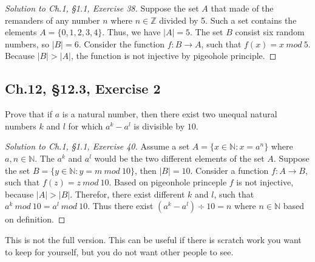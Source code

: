\documentclass[12pt]{amsart}
\numberwithin{equation}{section}
\theoremstyle{definition}
\theoremstyle{remark}
\newif\ifnotes
\begin{document}
\begin{proof}[Solution to Ch.1, \S 1.1,  Exercise 38] Suppose the set $ A $ that made of the remanders of any number $ n $ where $ n \in \mathbb{Z} $ divided by 5. Such a set contains the elements $ A = \{0, 1, 2, 3 ,4 \} $. Thus, we have $ |A| = 5 $. The set $ B $ consist six random numbers, so $ |\textit{B}| = 6 $. Consider the function $ f : B \rightarrow A $, such that $ f(x) = x \ mod \  5 $. Because $ |B| > |A| $, the function is not injective by pigeohole principle.
\end{proof}




\subsection*{Ch.12, \S 12.3,  Exercise 2}  Prove that if $ a $ is a natural number, then there exist two unequal natural numbers $ k $ and $ l $ for which $ a^k - a^l $ is divisible by $ 10 $.

\begin{proof}[Solution to Ch.1, \S 1.1,  Exercise 40] Assume a set $ A = \{ x \in \mathbb{N} : x = a^n \} $ where $ a,n \in \mathbb{N} $. The $ a^k $ and $ a^l $ would be the two different elements of the set $ A $. Suppose the set $ B = \{ y \in \mathbb{N} : y = m \ mod \ 10 \} $, then $ |B| = 10 $. Consider a function $ f : A \rightarrow B $, such that $ f(z) = z \ mod \ 10 $. Based on pigeonhole princeple $ f $ is not injective, because $ |A| > |B| $. Therefor, there exist different $ k $ and $ l $, such that $ a^k \ mod \ 10 = a^l \ mod \ 10 $. Thus there exist $ (a^k - a^l) \div 10 = n $ where $ n \in \mathbb{N} $ based on definition.
\end{proof}





\ifnotes


\else
	This is not the full version.  This can be useful if there is scratch work you want to keep for yourself, but you do not want other people to see. 
\fi





\end{document}
